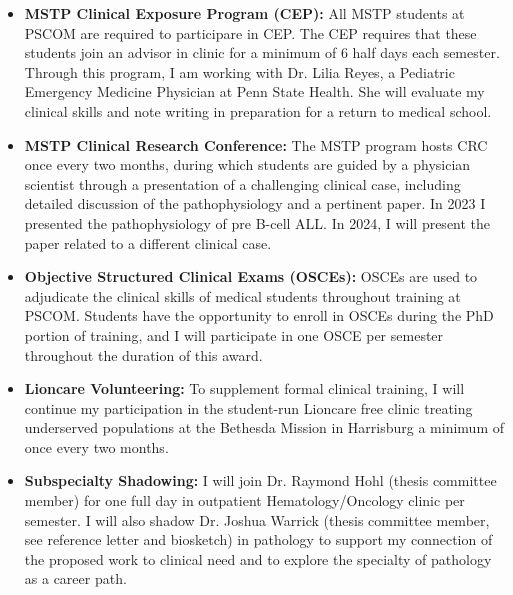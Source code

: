 \documentclass{NIHGrant}
\begin{document}
\begin{itemize}[leftmargin=*, nosep]
  \item \textbf{MSTP Clinical Exposure Program (CEP):} All MSTP students at PSCOM are required to participare in CEP. The CEP requires that these students join an advisor in clinic for a minimum of 6 half days each semester. Through this program, I am working with Dr. Lilia Reyes, a Pediatric Emergency Medicine Physician at Penn State Health. She will evaluate my clinical skills and note writing in preparation for a return to medical school.
  \item \textbf{MSTP Clinical Research Conference:} The MSTP program hosts CRC once every two months, during which students are guided by a physician scientist through a presentation of a challenging clinical case, including detailed discussion of the pathophysiology and a pertinent paper. In 2023 I presented the pathophysiology of pre B-cell ALL. In 2024, I will present the paper related to a different clinical case.
  \item \textbf{Objective Structured Clinical Exams (OSCEs):} OSCEs are used to adjudicate the clinical skills of medical students throughout training at PSCOM. Students have the opportunity to enroll in OSCEs during the PhD portion of training, and I will participate in one OSCE per semester throughout the duration of this award.
  \item \textbf{Lioncare Volunteering:} To supplement formal clinical training, I will continue my participation in the student-run Lioncare free clinic treating underserved populations at the Bethesda Mission in Harrisburg a minimum of once every two months.
  \item \textbf{Subspecialty Shadowing:} I will join Dr. Raymond Hohl (thesis committee member) for one full day in outpatient Hematology/Oncology clinic per semester. I will also shadow Dr. Joshua Warrick (thesis committee member, see reference letter and biosketch) in pathology to support my connection of the proposed work to clinical need and to explore the specialty of pathology as a career path.
\end{itemize}
\end{document}
